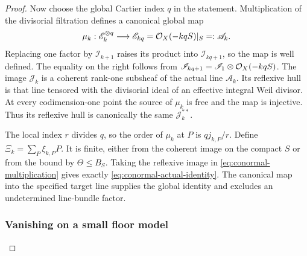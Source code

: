 \begin{proof}
Now choose the global Cartier index \(q\) in the statement.  Multiplication
of the divisorial filtration defines a canonical global map
\begin{equation}\label{eq:conormal-multiplication}
 \mu_k:\mathscr E_k^{\otimes q}\longrightarrow\mathscr E_{kq}
     =\mathcal O_X(-kqS)|_S=:\mathscr A_k .
\end{equation}
Replacing one factor by \(\mathscr I_{k+1}\) raises its product into
\(\mathscr I_{kq+1}\), so the map is well defined.  The equality on the
right follows from
\(\mathscr I_{kq+1}=\mathscr I_1\otimes\mathcal O_X(-kqS)\).
The image \(\mathscr J_k\) is a coherent rank-one subsheaf of the actual
line \(\mathscr A_k\).  Its reflexive hull is that line tensored with
the divisorial ideal of an effective integral Weil divisor.  At every
codimension-one point the source of \(\mu_k\) is free and the map is
injective.  Thus its reflexive hull is canonically the same
\(\mathscr J_k^{**}\).

The local index \(r\) divides \(q\), so the order of \(\mu_k\) at \(P\)
is \(qj_{k,P}/r\).  Define
\(\Xi_k=\sum_P\xi_{k,P}P\).  It is finite, either from the coherent
image on the compact \(S\) or from the bound by \(\Theta\leq B_S\).
Taking the reflexive image in \eqref{eq:conormal-multiplication} gives
exactly \eqref{eq:conormal-actual-identity}.  The canonical map into
the specified target line supplies the global identity and excludes an
undetermined line-bundle factor.

\subsubsection*{Vanishing on a small floor model}


\end{proof}
